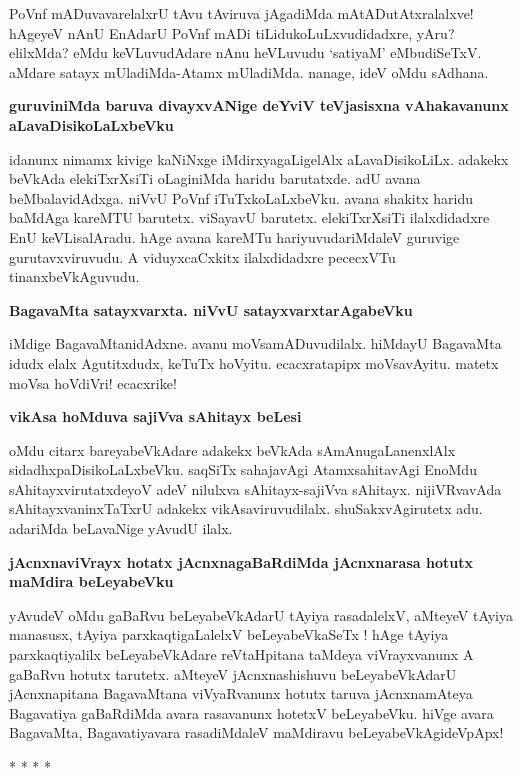 PoVnf mADuva\-varelalxrU tAvu tAviruva jAgadiMda mAtADutAtxralalxve! hAgeyeV nAnU EnAdarU PoVnf mADi tiLidukoLuLxvudidadxre, yAru? elilxMda? eMdu keVLuvudAdare nAnu heVLuvudu `satiyaM' eMbu\-diSeTxV. aMdare satayx mUladiMda-Atamx mUladiMda. nanage, ideV oMdu sAdhana.

{\bigskip
\noindent
{\large\bf guruviniMda baruva divayxvANige deYviV teVjasisxna vAhakavanunx aLavaDisi\-koLaLxbeVku}}\label{page79}
\medskip

\noindent
idanunx nimamx kivige kaNiNxge iMdirxyagaLigelAlx aLavaDisikoLiLx. adakekx beVkAda elekiTxrXsiTi oLaginiMda haridu barutatxde. adU avana beMbalavidAdxga. niVvU PoVnf iTuTxkoLaLxbeVku. avana shakitx haridu baMdAga kareMTU barutetx. viSayavU barutetx. elekiTxrXsiTi ilalxdidadxre EnU keVLisalAradu. hAge avana kareMTu hariyuvudariMdaleV guruvige gurutavxviruvudu. A viduyxcaCxkitx ilalxdidadxre pececxVTu tinanxbeVkA\-guvudu.

{\bigskip
\noindent
{\large\bf BagavaMta satayxvarxta. niVvU satayxvarxtarAgabeVku}}\label{page79}
\medskip

\noindent
iMdige BagavaMtanidAdxne. avanu moVsamADuvudilalx. hiMdayU BagavaMta idudx elalx Agutitxdudx, keTuTx hoVyitu. ecacxratapipx moVsavAyitu. matetx moVsa hoVdiVri! ecacxrike!

{\bigskip
\noindent
{\large\bf vikAsa hoMduva sajiVva sAhitayx beLesi}}
\medskip

\noindent
oMdu citarx bareyabeVkAdare adakekx beVkAda sAmAnugaLanenxlAlx sidadhxpaDisi\-koLaLxbeVku. saqSiTx sahaja\-vAgi AtamxsahitavAgi EnoMdu sAhitayxvirutatxdeyoV adeV nilulxva sAhitayx-sajiVva sAhitayx. nijiVRva\-vAda sAhitayxvaninxTaTxrU adakekx vikAsaviruvudilalx. shuSakxvAgirutetx adu. adariMda beLavaNige yAvudU ilalx.

{\bigskip
\noindent
{\large\bf jAcnxnaviVrayx hotatx jAcnxnagaBaRdiMda jAcnxnarasa hotutx maMdira beLeyabeVku}}\label{page79}
\medskip

\noindent
yAvudeV oMdu gaBaRvu beLeyabeVkAdarU tAyiya rasadalelxV, aMteyeV tAyiya manasusx,\- tAyiya parxkaqtigaLalelxV beLeyabeVkaSeTx ! hAge tAyiya parxkaqtiyalilx beLeyabeVkAdare reVtaHpitana taMdeya viVrayxvanunx A gaBaRvu hotutx tarutetx. aMteyeV jAcnxnashishuvu beLeyabeVkAdarU jAcnxnapitana BagavaMtana viVyaRvanunx hotutx taruva jAcnxna\-mAteya Bagavatiya gaBaR\-diMda avara rasa\-vanunx hotetxV beLeyabeVku. hiVge avara BagavaMta, Bagavatiyavara rasadiMdaleV maMdiravu beLeya\break\-beVkAgideVpApx!

\begin{center}
* * * *
\end{center}

